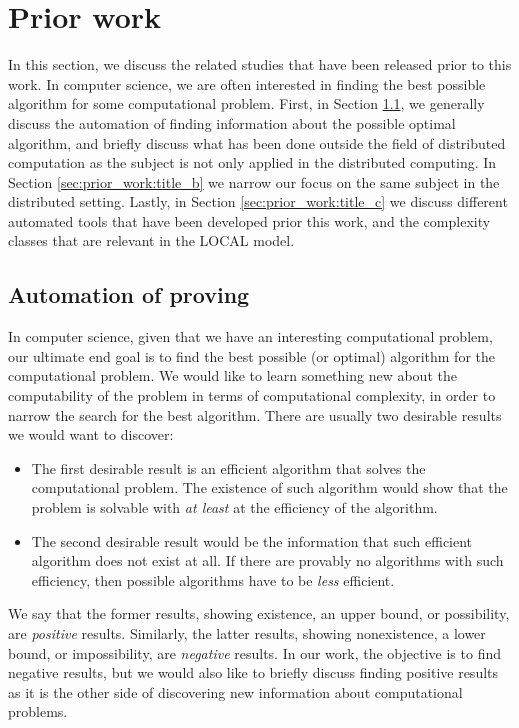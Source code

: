 
\section{Prior work} \label{sec:prior_work}
In this section, we discuss the related studies that have been released prior to this work.
In computer science, we are often interested in finding the best possible algorithm for some computational problem.
First, in Section \ref{sec:prior_work:title_a}, we generally discuss the automation of finding information about the possible optimal algorithm, and briefly discuss what has been done outside the field of distributed computation as the subject is not only applied in the distributed computing.
In Section \ref{sec:prior_work:title_b} we narrow our focus on the same subject in the distributed setting.
Lastly, in Section \ref{sec:prior_work:title_c} we discuss different automated tools that have been developed prior this work, and the complexity classes that are relevant in the LOCAL model.

\subsection{Automation of proving} \label{sec:prior_work:title_a} %
In computer science, given that we have an interesting computational problem, our ultimate end goal is to find the best possible (or optimal) algorithm for the computational problem.
We would like to learn something new about the computability of the problem in terms of computational complexity, in order to narrow the search for the best algorithm.
There are usually two desirable results we would want to discover:
\begin{itemize}
    \item
    The first desirable result is an efficient algorithm that solves the computational problem.
    The existence of such algorithm would show that the problem is solvable with \emph{at least} at the efficiency of the algorithm.
    \item
    The second desirable result would be the information that such efficient algorithm does not exist at all.
    If there are provably no algorithms with such efficiency, then possible algorithms have to be \emph{less} efficient.
\end{itemize}
We say that the former results, showing existence, an upper bound, or possibility, are \emph{positive} results.
Similarly, the latter results, showing nonexistence, a lower bound, or impossibility, are \emph{negative} results.
In our work, the objective is to find negative results, but we would also like to briefly discuss finding positive results as it is the other side of discovering new information about computational problems.

